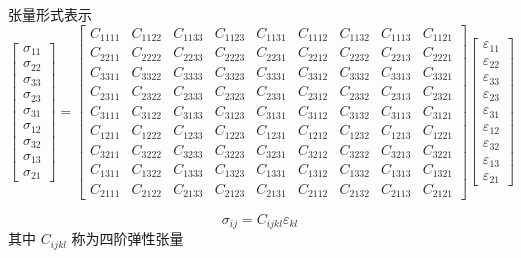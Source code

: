 \documentclass[12pt,a4paper]{article}
\begin{document}
张量形式表示
$$
\begin{bmatrix}
\sigma_{11} \\
\sigma_{22} \\
\sigma_{33} \\
\sigma_{23} \\
\sigma_{31} \\
\sigma_{12} \\
\sigma_{32} \\
\sigma_{13} \\
\sigma_{21}
\end{bmatrix}=
\begin{bmatrix}
C_{1111} & C_{1122} & C_{1133} & C_{1123} & C_{1131} & C_{1112} & C_{1132} & C_{1113} & C_{1121} \\
C_{2211} & C_{2222} & C_{2233} & C_{2223} & C_{2231} & C_{2212} & C_{2232} & C_{2213} & C_{2221} \\
C_{3311} & C_{3322} & C_{3333} & C_{3323} & C_{3331} & C_{3312} & C_{3332} & C_{3313} & C_{3321} \\
C_{2311} & C_{2322} & C_{2333} & C_{2323} & C_{2331} & C_{2312} & C_{2332} & C_{2313} & C_{2321} \\
C_{3111} & C_{3122} & C_{3133} & C_{3123} & C_{3131} & C_{3112} & C_{3132} & C_{3113} & C_{3121} \\
C_{1211} & C_{1222} & C_{1233} & C_{1223} & C_{1231} & C_{1212} & C_{1232} & C_{1213} & C_{1221} \\
C_{3211} & C_{3222} & C_{3233} & C_{3223} & C_{3231} & C_{3212} & C_{3232} & C_{3213} & C_{3221} \\
C_{1311} & C_{1322} & C_{1333} & C_{1323} & C_{1331} & C_{1312} & C_{1332} & C_{1313} & C_{1321} \\
C_{2111} & C_{2122} & C_{2133} & C_{2123} & C_{2131} & C_{2112} & C_{2132} & C_{2113} & C_{2121} 
\end{bmatrix}
\begin{bmatrix}
\varepsilon_{11} \\
\varepsilon_{22} \\
\varepsilon_{33} \\
\varepsilon_{23} \\
\varepsilon_{31} \\
\varepsilon_{12} \\
\varepsilon_{32} \\
\varepsilon_{13} \\
\varepsilon_{21}
\end{bmatrix}
$$

$$
\sigma_{ij}=C_{ijkl}\varepsilon_{kl}
$$
其中 $C_{ijkl}$ 称为四阶弹性张量
\end{document}
